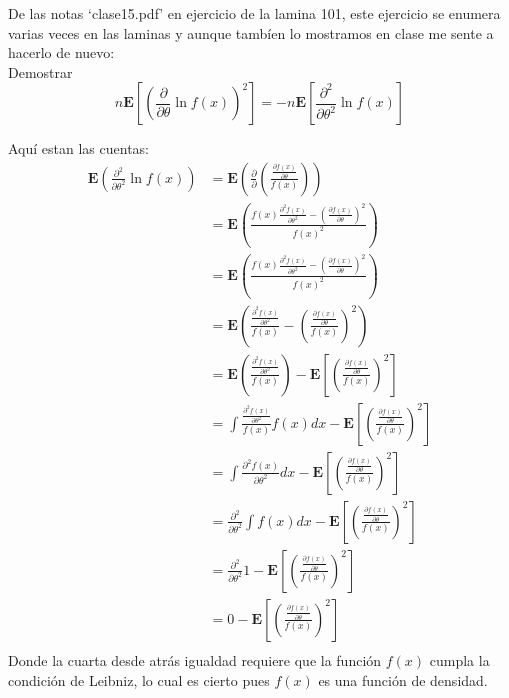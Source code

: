 \documentclass[letter]{memoir} %
\newenvironment{cframe}[1][blue]
  {\begin{tcolorbox}[colframe=#1,colback=white]}
  {\end{tcolorbox}}
\begin{document}
\begin{enumerate}
\begin{cframe}[violet]
\item  De las notas ‘clase15.pdf’ en ejercicio de la lamina 101, este ejercicio se enumera varias veces en las laminas y aunque tambíen lo mostramos en clase me sente a hacerlo de nuevo: \\
Demostrar
\[
n \mathbf{E} \left[ (\frac{\partial}{\partial \theta}\ln f(x))^2\right] = -n \mathbf{E}\left[\frac{\partial^2}{\partial \theta ^2}\ln f(x)\right]
\]
\end{cframe}
Aquí estan las cuentas:
\[
\begin{split}
\mathbf{E}\left(\frac{\partial^2}{\partial \theta^2}\ln f(x) \right) & = \mathbf{E}\left(\frac{\partial}{\partial} ( \frac{  \frac{\partial f(x)}{ \partial \theta} }{f(x)} )\right) \\ 
& = \mathbf{E}\left( \frac{f(x) \frac{\partial^2 f(x)}{\partial  \theta^2} - (\frac{\partial f(x)}{ \partial \theta})^2} {f(x)^2}\right) \\
& = \mathbf{E}\left( \frac{ f(x) \frac{\partial^2 f(x)}{\partial  \theta^2} - (\frac{\partial f(x)}{ \partial \theta})^2}{f(x)^2}\right) \\
& = \mathbf{E}\left( \frac{  \frac{\partial^2 f(x)}{\partial  \theta^2}}{f(x) } - \left(\frac{\frac{\partial f(x)}{ \partial \theta} }{f(x)} \right)^2 \right) \\
& = \mathbf{E}\left( \frac{  \frac{\partial^2 f(x)}{\partial  \theta^2} }{f(x) } \right) -  \mathbf{E} \left[\left( \frac{\frac{\partial f(x)}{ \partial \theta} }{f(x)}  \right) ^2\right]\\
& =\int \frac{  \frac{\partial^2 f(x)}{\partial  \theta^2} }{f(x) } f(x) dx -   \mathbf{E} \left[\left( \frac{\frac{\partial f(x)}{ \partial \theta} }{f(x)}  \right) ^2\right]\\
& =\int   \frac{\partial^2 f(x)}{\partial  \theta^2 } dx -   \mathbf{E} \left[ \left( \frac{\frac{\partial f(x)}{ \partial \theta} }{f(x)}   \right) ^2\right]\\
& =    \frac{\partial^2 }{\partial  \theta^2 } \int f(x) dx -   \mathbf{E} \left[ \left( \frac{\frac{\partial f(x)}{ \partial \theta} }{f(x)}   \right) ^2\right]\\
& =    \frac{\partial^2 }{\partial  \theta^2 } 1 -   \mathbf{E} \left[ \left( \frac{\frac{\partial f(x)}{ \partial \theta} }{f(x)}   \right) ^2\right]\\
& =    0 -   \mathbf{E} \left[ \left( \frac{\frac{\partial f(x)}{ \partial \theta} }{f(x)}   \right) ^2\right]\\
\end{split}
\]
Donde la cuarta desde atrás igualdad requiere que la función $f(x)$ cumpla la condición de Leibniz, lo cual es cierto pues $f(x)$ es una función de densidad.\\


\end{enumerate}
\end{document}
